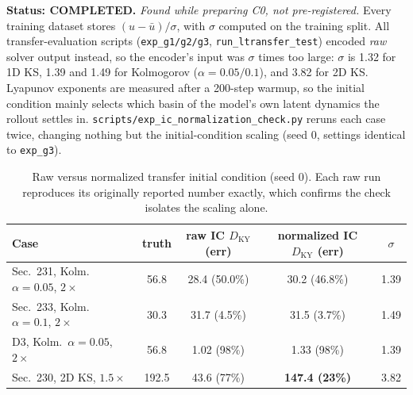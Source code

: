 \documentclass[11pt]{article}
\begin{document}
{\sloppy\textbf{Status: COMPLETED.} \emph{Found while preparing C0, not
pre-registered.} Every training dataset stores
$(u-\bar u)/\sigma$, with $\sigma$ computed on the training split. All
transfer-evaluation scripts (\texttt{exp\_g1/g2/g3},
\texttt{run\_ltransfer\_test}) encoded \emph{raw} solver output instead,
so the encoder's input was $\sigma$ times too large: $\sigma$ is 1.32 for
1D KS, 1.39 and 1.49 for Kolmogorov ($\alpha{=}0.05/0.1$), and 3.82 for
2D KS. Lyapunov exponents are measured after a 200-step warmup, so the
initial condition mainly selects which basin of the model's own latent
dynamics the rollout settles in.
\texttt{scripts/exp\_ic\_normalization\_check.py} reruns each case twice,
changing nothing but the initial-condition scaling (seed 0, settings
identical to \texttt{exp\_g3}).\par}

\begin{table}[h]
\centering
\small
\begin{tabular}{lcccc}
\toprule
Case & truth & raw IC $D_{\mathrm{KY}}$ (err) & normalized IC $D_{\mathrm{KY}}$ (err) & $\sigma$ \\
\midrule
Sec.\ 231, Kolm.\ $\alpha{=}0.05$, $2\times$ & 56.8 & 28.4 (50.0\%) & 30.2 (46.8\%) & 1.39 \\
Sec.\ 233, Kolm.\ $\alpha{=}0.1$, $2\times$ & 30.3 & 31.7 (4.5\%) & 31.5 (3.7\%) & 1.49 \\
D3, Kolm.\ $\alpha{=}0.05$, $2\times$ & 56.8 & 1.02 (98\%) & 1.33 (98\%) & 1.39 \\
Sec.\ 230, 2D KS, $1.5\times$ & 192.5 & 43.6 (77\%) & \textbf{147.4 (23\%)} & 3.82 \\
\bottomrule
\end{tabular}
\caption{Raw versus normalized transfer initial condition (seed 0). Each
raw run reproduces its originally reported number exactly, which confirms
the check isolates the scaling alone.}
\label{tab:icnorm}
\end{table}
\end{document}
